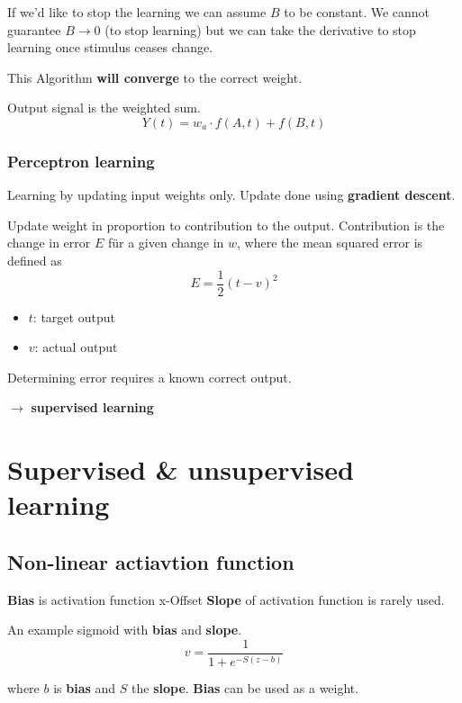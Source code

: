 \documentclass[
    fontsize      = 11pt,
    paper         = a4,
    twoside       = false,
    parskip       = half,
    pagesize      = false,
]{scrartcl}
\providecommand{\tightlist}{%
  \setlength{\itemsep}{0pt}\setlength{\parskip}{0pt}}
\begin{document}
If we'd like to stop the learning we can assume \(B\) to be constant. We
cannot guarantee \(B \rightarrow 0\) (to stop learning) but we can take
the derivative to stop learning once stimulus ceases change.

This Algorithm \textbf{will converge} to the correct weight.

Output signal is the weighted sum.
\[Y(t) = w_a \cdot f \left( A, t\right) + f \left( B, t\right)\]

\hypertarget{perceptron-learning}{%
\subsubsection{Perceptron learning}\label{perceptron-learning}}

Learning by updating input weights only. Update done using
\textbf{gradient descent}.

Update weight in proportion to contribution to the output. Contribution
is the change in error \(E\) für a given change in \(w\), where the mean
squared error is defined as \[E = \frac{1}{2} \left( t-v\right)^2\]

\begin{itemize}
\tightlist
\item
  \(t\): target output
\item
  \(v\): actual output
\end{itemize}

Determining error requires a known correct output.

\(\rightarrow\) \textbf{supervised learning}

\hypertarget{supervised-unsupervised-learning}{%
\section{Supervised \& unsupervised
learning}\label{supervised-unsupervised-learning}}

\hypertarget{non-linear-actiavtion-function}{%
\subsection{Non-linear actiavtion
function}\label{non-linear-actiavtion-function}}

\textbf{Bias} is activation function x-Offset \textbf{Slope} of
activation function is rarely used.

An example sigmoid with \textbf{bias} and \textbf{slope}.
\[v =  \frac{1}{1+e^{-S(z-b)}}\]

where \(b\) is \textbf{bias} and \(S\) the \textbf{slope}. \textbf{Bias}
can be used as a weight.
\end{document}
